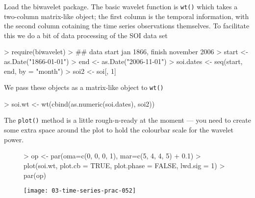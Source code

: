 \documentclass[a4paper,10pt]{article}
\begin{document}
Load the \textsf{biwavelet} package. The basic wavelet function is \texttt{wt()} which takes a two-column matrix-like object; the first column is the temporal information, with the second column cotaining the time series observations themselves. To facilitate this we do a bit of data processing of the SOI data set
\begin{Schunk}
\begin{Sinput}
> require(biwavelet)
> ## data start jan 1866, finish november 2006
> start <- as.Date("1866-01-01")
> end <- as.Date("2006-11-01")
> soi.dates <- seq(start, end, by = "month")
> soi2 <- soi[, 1]
\end{Sinput}
\end{Schunk}
We pass these objects as a matrix-like object to \texttt{wt()}
\begin{Schunk}
\begin{Sinput}
> soi.wt <- wt(cbind(as.numeric(soi.dates), soi2))
\end{Sinput}
\end{Schunk}

The \texttt{plot()} method is a little rough-n-ready at the moment --- you need to create some extra space around the plot to hold the colourbar scale for the wavelet power.
\begin{figure}[ht]
  \begin{center}
\begin{Schunk}
\begin{Sinput}
> op <- par(oma=c(0, 0, 0, 1), mar=c(5, 4, 4, 5) + 0.1)
> plot(soi.wt, plot.cb = TRUE, plot.phase = FALSE, lwd.sig = 1)
> par(op)
\end{Sinput}
\end{Schunk}
\texttt{[image: 03-time-series-prac-052]}
  \end{center}
\end{figure}
\end{document}
